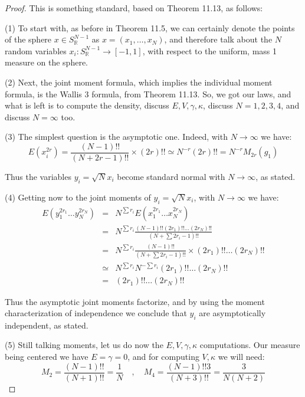 \documentclass[12pt]{amsbook}
\begin{document}
\begin{proof}
This is something standard, based on Theorem 11.13, as follows:

\medskip

(1) To start with, as before in Theorem 11.5, we can certainly denote the points of the sphere $x\in S^{N-1}_\mathbb R$ as $x=(x_1,\ldots,x_N)$, and therefore talk about the $N$ random variables $x_i:S^{N-1}_\mathbb R\to[-1,1]$, with respect to the uniform, mass 1 measure on the sphere.

\medskip

(2) Next, the joint moment formula, which implies the individual moment formula, is the Wallis 3 formula, from Theorem 11.13. So, we got our laws, and what is left is to compute the density, discuss $E,V,\gamma,\kappa$, discuss $N=1,2,3,4$, and discuss $N=\infty$ too.

\medskip

(3) The simplest question is the asymptotic one. Indeed, with $N\to\infty$ we have:
$$E(x_i^{2r})
=\frac{(N-1)!!}{(N+2r-1)!!}\times(2r)!!
\simeq N^{-r}(2r)!!
=N^{-r}M_{2r}(g_1)$$

Thus the variables $y_i=\sqrt{N}x_i$ become standard normal with $N\to\infty$, as stated.

\medskip

(4) Getting now to the joint moments of $y_i=\sqrt{N}x_i$, with $N\to\infty$ we have:
\begin{eqnarray*}
E(y_1^{2r_1}\ldots y_N^{2r_N})
&=&N^{\sum r_i}E(x_1^{2r_1}\ldots x_N^{2r_N})\\
&=&N^{\sum r_i}\frac{(N-1)!!(2r_1)!!\ldots(2r_N)!!}{(N+\sum 2r_i-1)!!}\\
&=&N^{\sum r_i}\frac{(N-1)!!}{(N+\sum 2r_i-1)!!}\times(2r_1)!!\ldots(2r_N)!!\\
&\simeq&N^{\sum r_i}N^{-\sum r_i}(2r_1)!!\ldots(2r_N)!!\\
&=&(2r_1)!!\ldots(2r_N)!!
\end{eqnarray*}

Thus the asymptotic joint moments factorize, and by using the moment characterization of independence we conclude that $y_i$ are asymptotically independent, as stated.

\medskip

(5) Still talking moments, let us do now the $E,V,\gamma,\kappa$ computations. Our measure being centered we have $E=\gamma=0$, and for computing $V,\kappa$ we will need:
$$M_2=\frac{(N-1)!!}{(N+1)!!}=\frac{1}{N}\quad,\quad M_4=\frac{(N-1)!!3}{(N+3)!!}=\frac{3}{N(N+2)}$$


\end{proof}
\end{document}
